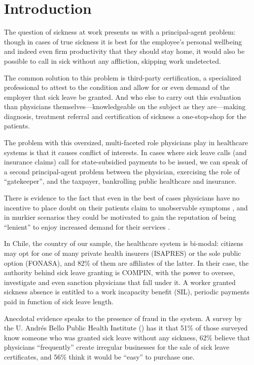 \documentclass[../main.tex]{subfiles}
\begin{document}
\section{Introduction}

The question of sickness at work presents us with a principal-agent problem: though in cases of true sickness it is best for the employee's personal wellbeing and indeed even firm productivity \cite{productivity} that they should stay home, it would also be possible to call in sick without any affliction, skipping work undetected.

The common solution to this problem is third-party certification, a specialized professional to attest to the condition and allow for or even demand of the employer that sick leave be granted. And who else to carry out this evaluation than physicians themselves—knowledgeable on the subject as they are—making diagnosis, treatment referral and certification of sickness a one-stop-shop for the patients.

The problem with this oversized, multi-faceted role physicians play in healthcare systems is that it causes conflict of interests. In cases where sick leave calls (and insurance claims) call for state-subsidied payments to be issued, we can speak of a second principal-agent problem between the physician, exercising the role of ``gatekeeper'', and the taxpayer, bankrolling public healthcare and insurance.

There is evidence to the fact that even in the best of cases physicians have no incentive to place doubt on their patients claim to unobservable symptoms \citep{cln}, and in murkier scenarios they could be motivated to gain the reputation of being ``lenient'' to enjoy increased demand for their services \citep{markussen-roed}.

In Chile, the country of our sample, the healthcare system is bi-modal: citizens may opt for one of many private health insurers (ISAPRES) or the sole public option (FONASA), and 82\% of them are affiliates of the latter. In their case, the authority behind sick leave granting is COMPIN, with the power to oversee, investigate and even sanction physicians that fall under it. A worker granted sickness absence is entitled to a work incapacity benefit (SIL), periodic payments paid in function of sick leave length.

Anecdotal evidence speaks to the presence of fraud in the system. A survey by the U. Andrés Bello Public Health Institute (\citeyear{unab}) has it that 51\% of those surveyed know someone who was granted sick leave without any sickness, 62\% believe that physicians ``frequently'' create irregular businesses for the sale of sick leave certificates, and 56\% think it would be ``easy'' to purchase one.
\end{document}
